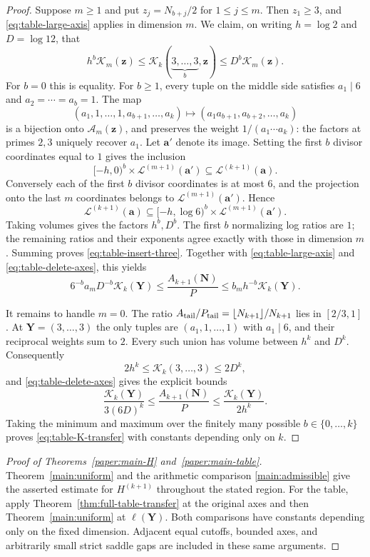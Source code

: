 \begin{proof}
Suppose $m\ge1$ and put $z_j=N_{b+j}/2$ for $1\le j\le m$.
Then $z_1\ge3$, and \eqref{eq:table-large-axis} applies in dimension
$m$. We claim, on writing $h=\log2$ and $D=\log12$, that
\begin{equation}\label{eq:table-insert-three}
 h^b\mathcal K_m(\mathbf z)
 \le\mathcal K_k(\underbrace{3,\ldots,3}_{b},\mathbf z)
 \le D^b\mathcal K_m(\mathbf z).
\end{equation}
For $b=0$ this is equality. For $b\ge1$, every tuple on the middle
side satisfies $a_1\mid6$ and $a_2=\cdots=a_b=1$.
The map
\[
 (a_1,1,\ldots,1,a_{b+1},\ldots,a_k)
 \longmapsto(a_1a_{b+1},a_{b+2},\ldots,a_k)
\]
is a bijection onto $\mathcal A_m(\mathbf z)$, and preserves the
weight $1/(a_1\cdots a_k)$: the factors at primes $2,3$ uniquely
recover $a_1$. Let $\mathbf a'$ denote its image. Setting the first
$b$ divisor coordinates equal to $1$ gives the inclusion
\[
 [-h,0)^b\times\mathcal L^{(m+1)}(\mathbf a')
 \subseteq\mathcal L^{(k+1)}(\mathbf a).
\]
Conversely each of the first $b$ divisor coordinates is at most $6$,
and the projection onto the last $m$ coordinates belongs to
$\mathcal L^{(m+1)}(\mathbf a')$. Hence
\[
 \mathcal L^{(k+1)}(\mathbf a)
 \subseteq[-h,\log6)^b\times\mathcal L^{(m+1)}(\mathbf a').
\]
Taking volumes gives the factors $h^b,D^b$. The first $b$
normalizing log ratios are $1$; the remaining ratios and their
exponents agree exactly with those in dimension $m$.
Summing proves \eqref{eq:table-insert-three}.
Together with \eqref{eq:table-large-axis} and
\eqref{eq:table-delete-axes}, this yields
\[
 6^{-b}a_mD^{-b}\mathcal K_k(\mathbf Y)
 \le\frac{A_{k+1}(\mathbf N)}P
 \le b_mh^{-b}\mathcal K_k(\mathbf Y).
\]

It remains to handle $m=0$. The ratio
$A_{\rm tail}/P_{\rm tail}=\lfloor N_{k+1}\rfloor/N_{k+1}$ lies in
$[2/3,1]$. At $\mathbf Y=(3,\ldots,3)$ the only tuples are
$(a_1,1,\ldots,1)$ with $a_1\mid6$, and their reciprocal weights
sum to $2$. Every such union has volume between $h^k$ and $D^k$.
Consequently
\[
 2h^k\le\mathcal K_k(3,\ldots,3)\le2D^k,
\]
and \eqref{eq:table-delete-axes} gives the explicit bounds
\[
 \frac{\mathcal K_k(\mathbf Y)}{3(6D)^k}
 \le\frac{A_{k+1}(\mathbf N)}P
 \le\frac{\mathcal K_k(\mathbf Y)}{2h^k}.
\]
Taking the minimum and maximum over the finitely many possible
$b\in\{0,\ldots,k\}$ proves \eqref{eq:table-K-transfer} with
constants depending only on $k$.
\end{proof}


\begin{proof}[Proof of Theorems~\ref{paper:main-H} and~\ref{paper:main-table}]
Theorem~\ref{main:uniform} and the arithmetic comparison
\eqref{main:admissible} give the asserted estimate for
$H^{(k+1)}$ throughout the stated region. For the table, apply
Theorem~\ref{thm:full-table-transfer} at the original axes and then
Theorem~\ref{main:uniform} at $\ell(\mathbf Y)$. Both comparisons have
constants depending only on the fixed dimension. Adjacent equal cutoffs,
bounded axes, and arbitrarily small strict saddle gaps are included in
these same arguments.
\end{proof}
